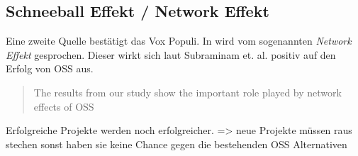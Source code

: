 \subsection{Schneeball Effekt / Network Effekt}



Eine zweite Quelle bestätigt das Vox Populi. In \cite{subramaniamDeterminantsOpenSource2009} %
wird vom sogenannten \textit{Network Effekt} gesprochen. Dieser wirkt sich laut
Subraminam et. al. positiv auf den Erfolg von OSS aus. 

\begin{quote}
    \begin{tcolorbox}[colback=black!5!white,colframe=white!75!black,title=Direkt Zitat aus \cite{subramaniamDeterminantsOpenSource2009} Kapitel 5.1.]
        The results from our study show the important role played by
        network effects of OSS
    \end{tcolorbox}
\end{quote}

\begin{hypothesis}
    Erfolgreiche Projekte werden noch erfolgreicher. => neue Projekte müssen raus stechen
    sonst haben sie keine Chance gegen die bestehenden OSS Alternativen
\end{hypothesis}
